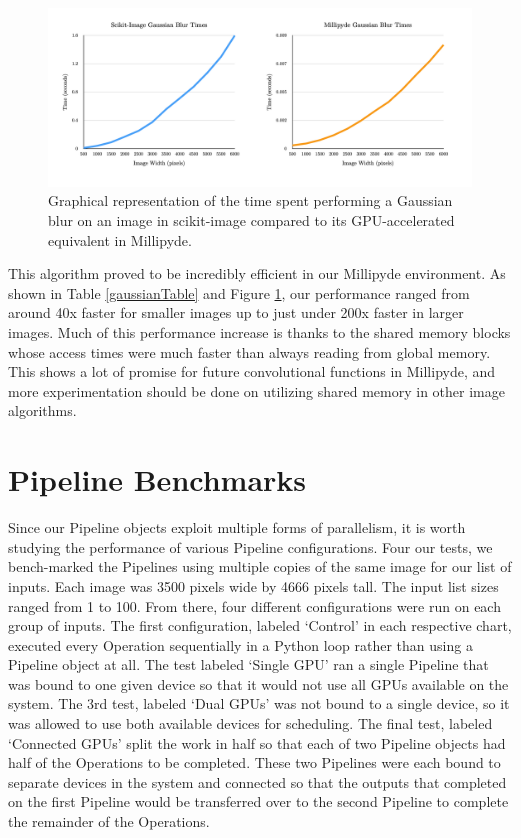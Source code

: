 \begin{figure}[H]
\includegraphics[width=\textwidth]{figures/gaussianComparison.png}
\centering
\caption{Graphical representation of the time spent performing a Gaussian blur on an image in scikit-image compared to its GPU-accelerated equivalent in Millipyde.}
\label{gaussianComparison}
\end{figure}

\quad This algorithm proved to be incredibly efficient in our Millipyde environment. As shown in Table \ref{gaussianTable} and Figure \ref{gaussianComparison}, our performance ranged from around 40x faster for smaller images up to just under 200x faster in larger images. Much of this performance increase is thanks to the shared memory blocks whose access times were much faster than always reading from global memory. This shows a lot of promise for future convolutional functions in Millipyde, and more experimentation should be done on utilizing shared memory in other image algorithms. 

\section{Pipeline Benchmarks}

Since our Pipeline objects exploit multiple forms of parallelism, it is worth studying the performance of various Pipeline configurations. Four our tests, we bench-marked the Pipelines using multiple copies of the same image for our list of inputs. Each image was 3500 pixels wide by 4666 pixels tall. The input list sizes ranged from 1 to 100. From there, four different configurations were run on each group of inputs. The first configuration, labeled `Control' in each respective chart, executed every Operation sequentially in a Python loop rather than using a Pipeline object at all. The test labeled `Single GPU' ran a single Pipeline that was bound to one given device so that it would not use all GPUs available on the system. The 3rd test, labeled `Dual GPUs' was not bound to a single device, so it was allowed to use both available devices for scheduling. The final test, labeled `Connected GPUs' split the work in half so that each of two Pipeline objects had half of the Operations to be completed. These two Pipelines were each bound to separate devices in the system and connected so that the outputs that completed on the first Pipeline would be transferred over to the second Pipeline to complete the remainder of the Operations.

